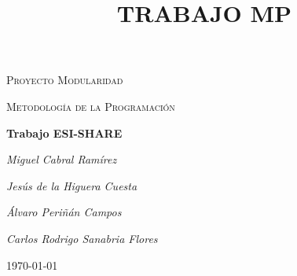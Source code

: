 
\title{TRABAJO MP}



\begin{titlepage}
	\centering
	{\scshape\LARGE Proyecto Modularidad \par}
	\vspace{1cm}
	{\scshape\Large Metodología de la Programación\par}
	\vspace{7cm}
	{\huge\bfseries\Huge Trabajo ESI-SHARE\par}
	\vspace{7cm}
	{\Large\itshape Miguel Cabral Ramírez\par}
    {\Large\itshape Jesús de la Higuera Cuesta\par}
    {\Large\itshape Álvaro Periñán Campos\par}
    {\Large\itshape Carlos Rodrigo Sanabria Flores\par}
	\vfill

	{\large \today\par}
\end{titlepage}

\tableofcontents
\newpage











